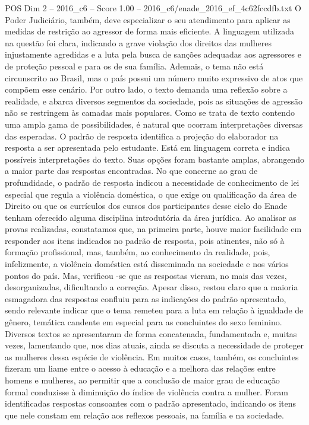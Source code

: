 \begin{textsample}{POS Dim 2 – 2016\_c6 – Score 1.00 – 2016\_c6/enade\_2016\_ef\_4c62fccdfb.txt}
O Poder Judiciário, também, deve especializar o seu atendimento para aplicar as medidas de restrição ao agressor de forma mais eficiente.
A linguagem utilizada na questão foi clara, indicando a grave violação dos direitos das mulheres injustamente agredidas e a luta pela busca de sanções adequadas aos agressores e de proteção pessoal e para os de sua família.
Ademais, o tema não está circunscrito ao Brasil, mas o país possui um número muito expressivo de atos que compõem esse cenário.
Por outro lado, o texto demanda uma reflexão sobre a realidade, e abarca diversos segmentos da sociedade, pois as situações de agressão não se restringem às camadas mais populares.
Como se trata de texto contendo uma ampla gama de possibilidades, é natural que ocorram interpretações diversas das esperadas.
O padrão de resposta identifica a projeção do elaborador na resposta a ser apresentada pelo estudante.
Está em linguagem correta e indica possíveis interpretações do texto.
Suas opções foram bastante amplas, abrangendo a maior parte das respostas encontradas.
No que concerne ao grau de profundidade, o padrão de resposta indicou a necessidade de conhecimento de lei especial que regula a violência doméstica, o que exige ou qualificação da área de Direito ou que os currículos dos cursos dos participantes desse ciclo do Enade tenham oferecido alguma disciplina introdutória da área jurídica.
Ao analisar as provas realizadas, constatamos que, na primeira parte, houve maior facilidade em responder aos itens indicados no padrão de resposta, pois atinentes, não só à formação profissional, mas, também, ao conhecimento da realidade, pois, infelizmente, a violência doméstica está disseminada na sociedade e nos vários pontos do país.
Mas, verificou -se que as respostas vieram, no mais das vezes, desorganizadas, dificultando a correção.
Apesar disso, restou claro que a maioria esmagadora das respostas confluiu para as indicações do padrão apresentado, sendo relevante indicar que o tema remeteu para a luta em relação à igualdade de gênero, temática candente em especial para as concluintes do sexo feminino.
Diversos textos se apresentaram de forma concatenada, fundamentada e, muitas vezes, lamentando que, nos dias atuais, ainda se discuta a necessidade de proteger as mulheres dessa espécie de violência.
Em muitos casos, também, os concluintes fizeram um liame entre o acesso à educação e a melhora das relações entre homens e mulheres, ao permitir que a conclusão de maior grau de educação formal conduzisse à diminuição do índice de violência contra a mulher.
Foram identificadas respostas consoantes com o padrão apresentado, indicando os itens que nele constam em relação aos reflexos pessoais, na família e na sociedade.

\end{textsample}
